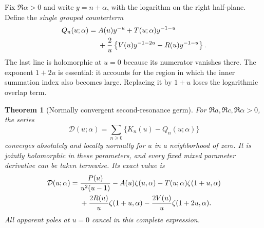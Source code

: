 \documentclass[11pt,letterpaper]{article}
\newtheorem{theorem}{Theorem}[section]
\theoremstyle{definition}
\theoremstyle{remark}
\numberwithin{equation}{section}
\begin{document}
Fix $\Re\alpha>0$ and write $y=n+\alpha$, with the logarithm on the
right half-plane. Define the \emph{single grouped counterterm}
\begin{align}
 Q_n(u;\alpha)={}&A(u)y^{-u}+T(u;\alpha)y^{-1-u}\notag\\
 &+\frac2u\left\{V(u)y^{-1-2u}-R(u)y^{-1-u}\right\}.
 \label{sr:eq:Q}
\end{align}
The last line is holomorphic at $u=0$ because its numerator vanishes
there. The exponent $1+2u$ is essential: it accounts for the region in
which the inner summation index also becomes large. Replacing it by
$1+u$ loses the logarithmic overlap term.

\begin{theorem}[Normally convergent second-resonance germ]
\label{sr:thm:germ}
For $\Re a,\Re c,\Re\alpha>0$, the series
\begin{equation}\label{sr:eq:D}
 \mathcal D(u;\alpha)=\sum_{n\ge0}\{K_n(u)-Q_n(u;\alpha)\}
\end{equation}
converges absolutely and locally normally for $u$ in a neighborhood of
zero. It is jointly holomorphic in these parameters, and every fixed
mixed parameter derivative can be taken termwise. Its exact value is
\begin{align}
 \mathcal D(u;\alpha)={}&\frac{P(u)}{u^2(u-1)}-A(u)\zeta(u,\alpha)
 -T(u;\alpha)\zeta(1+u,\alpha)\notag\\
 &+\frac{2R(u)}u\zeta(1+u,\alpha)
 -\frac{2V(u)}u\zeta(1+2u,\alpha).
 \label{sr:eq:master}
\end{align}
All apparent poles at $u=0$ cancel in this complete expression.
\end{theorem}
\end{document}

